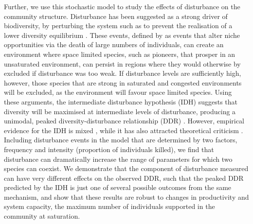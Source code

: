 Further, we use this stochastic model to study the effects of disturbance on the community structure. Disturbance has been suggested as a strong driver of biodiversity, by perturbing the system such as to prevent the realisation of a lower diversity equilibrium \citep[e.g.][]{denslow1987tropical,sousa1984role}. These events, defined by \cite{shea2004moving} as events that alter niche opportunities via the death of large numbers of individuals, can create an environment where space limited species, such as pioneers, that prosper in an unsaturated environment, can persist in regions where they would otherwise by excluded if disturbance was too weak. If disturbance levels are sufficiently high, however, those species that are strong in saturated and congested environments will be excluded, as the environment will favour space limited species. Using these arguments, the intermediate disturbance hypothesis (IDH) suggests that diversity will be maximised at intermediate levels of disturbance, producing a unimodal, peaked diversity-disturbance relationship (DDR) \citep[e.g.][]{connell1978diversity,grime1973competitive,huston1979general}. However, empirical evidence for the IDH is mixed \citep[see review in ][]{mackey2001diversity}, while it has also attracted theoretical criticism \citep[e.g.][]{fox2012intermediate}. Including disturbance events in the model that are determined by two factors, frequency and intensity (proportion of individuals killed), we find that disturbance can dramatically increase the range of parameters for which two species can coexist. We demonstrate that the component of disturbance measured can have very different effects on the observed DDR, such that the peaked DDR predicted by the IDH is just one of several possible outcomes from the same mechanism, and show that these results are robust to changes in productivity and system capacity, the maximum number of individuals supported in the community at saturation.

